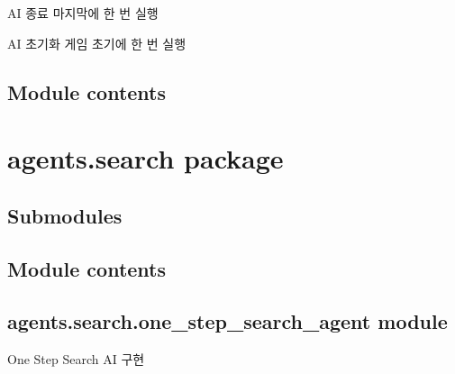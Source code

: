\documentclass[letterpaper,10pt,english]{sphinxmanual}
\begin{document}
\begin{fulllineitems}
\begin{fulllineitems}
\end{fulllineitems}


\begin{fulllineitems}
\label{\detokenize{agents.basic:agents.basic.random_agent.RandomAgent.close}}
AI 종료
마지막에 한 번 실행

\end{fulllineitems}


\begin{fulllineitems}
\label{\detokenize{agents.basic:agents.basic.random_agent.RandomAgent.reset}}
AI 초기화
게임 초기에 한 번 실행

\end{fulllineitems}


\end{fulllineitems}



\subsection{Module contents}
\label{\detokenize{agents.basic:module-agents.basic}}\label{\detokenize{agents.basic:module-contents}}

\section{agents.search package}
\label{\detokenize{agents.search:agents-search-package}}\label{\detokenize{agents.search::doc}}

\subsection{Submodules}
\label{\detokenize{agents.search:submodules}}

\subsection{Module contents}
\label{\detokenize{agents.search:module-contents}}\label{\detokenize{agents.search:module-agents.search}}

\subsection{agents.search.one\_step\_search\_agent module}
\label{\detokenize{agents.search:module-agents.search.one_step_search_agent}}\label{\detokenize{agents.search:agents-search-one-step-search-agent-module}}
One Step Search AI 구현
\end{document}
